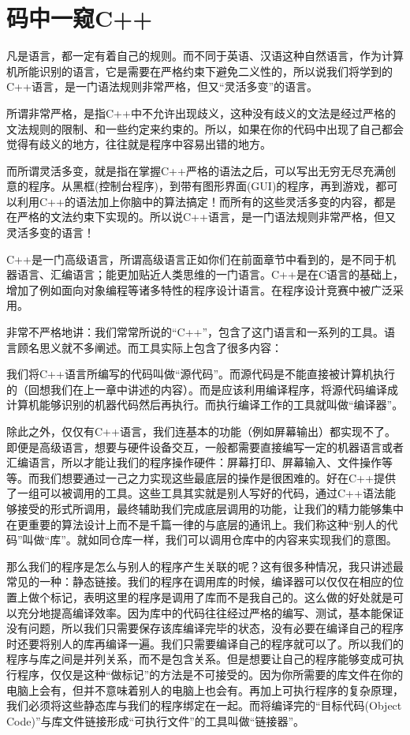 \chapter{码中一窥C++}


凡是语言，都一定有着自己的规则。而不同于英语、汉语这种自然语言，作为计算机所能识别的语言，它是需要在严格约束下避免二义性的，所以说我们将学到的C++语言，是一门语法规则非常严格，但又“灵活多变”的语言。

所谓非常严格，是指C++中不允许出现歧义，这种没有歧义的文法是经过严格的文法规则的限制、和一些约定来约束的。所以，如果在你的代码中出现了自己都会觉得有歧义的地方，往往就是程序中容易出错的地方。

而所谓灵活多变，就是指在掌握C++严格的语法之后，可以写出无穷无尽充满创意的程序。从黑框(控制台程序)，到带有图形界面(GUI)的程序，再到游戏，都可以利用C++的语法加上你脑中的算法搞定！而所有的这些灵活多变的内容，都是在严格的文法约束下实现的。所以说C++语言，是一门语法规则非常严格，但又灵活多变的语言！

C++是一门高级语言，所谓高级语言正如你们在前面章节中看到的，是不同于机器语言、汇编语言；能更加贴近人类思维的一门语言。C++是在C语言的基础上，增加了例如面向对象编程等诸多特性的程序设计语言。在程序设计竞赛中被广泛采用。

非常不严格地讲：我们常常所说的“C++”，包含了这门语言和一系列的工具。语言顾名思义就不多阐述。而工具实际上包含了很多内容：

我们将C++语言所编写的代码叫做“源代码”。而源代码是不能直接被计算机执行的（回想我们在上一章中讲述的内容）。而是应该利用编译程序，将源代码编译成计算机能够识别的机器代码然后再执行。而执行编译工作的工具就叫做“编译器”。

除此之外，仅仅有C++语言，我们连基本的功能（例如屏幕输出）都实现不了。即便是高级语言，想要与硬件设备交互，一般都需要直接编写一定的机器语言或者汇编语言，所以才能让我们的程序操作硬件：屏幕打印、屏幕输入、文件操作等等。而我们想要通过一己之力实现这些最底层的操作是很困难的。好在C++提供了一组可以被调用的工具。这些工具其实就是别人写好的代码，通过C++语法能够接受的形式所调用，最终辅助我们完成底层调用的功能，让我们的精力能够集中在更重要的算法设计上而不是千篇一律的与底层的通讯上。我们称这种“别人的代码”叫做“库”。就如同仓库一样，我们可以调用仓库中的内容来实现我们的意图。

那么我们的程序是怎么与别人的程序产生关联的呢？这有很多种情况，我只讲述最常见的一种：静态链接。我们的程序在调用库的时候，编译器可以仅仅在相应的位置上做个标记，表明这里的程序是调用了库而不是我自己的。这么做的好处就是可以充分地提高编译效率。因为库中的代码往往经过严格的编写、测试，基本能保证没有问题，所以我们只需要保存该库编译完毕的状态，没有必要在编译自己的程序时还要将别人的库再编译一遍。我们只需要编译自己的程序就可以了。所以我们的程序与库之间是并列关系，而不是包含关系。但是想要让自己的程序能够变成可执行程序，仅仅是这种“做标记”的方法是不可接受的。因为你所需要的库文件在你的电脑上会有，但并不意味着别人的电脑上也会有。再加上可执行程序的复杂原理，我们必须将这些静态库与我们的程序绑定在一起。而将编译完的“目标代码(Object Code)”与库文件链接形成“可执行文件”的工具叫做“链接器”。

